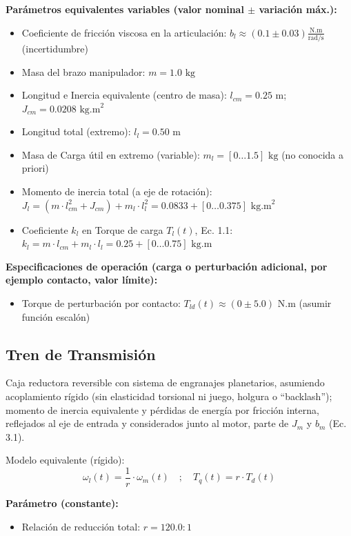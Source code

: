 \documentclass[11pt,a4paper]{article}
\begin{document}
\textbf{Parámetros equivalentes variables (valor nominal \(\pm\) variación máx.):}
\begin{itemize}
    \item Coeficiente de fricción viscosa en la articulación: $b_{l} \approx (0.1 \pm 0.03) \frac{\text{N.m}}{\text{rad/s}}$ (incertidumbre)
    \item Masa del brazo manipulador: $m = 1.0 \text{ kg}$
    \item Longitud e Inercia equivalente (centro de masa): $l_{cm} = 0.25 \text{ m}$; $J_{cm} = 0.0208 \text{ kg.m}^2$
    \item Longitud total (extremo): $l_{l} = 0.50 \text{ m}$
    \item Masa de Carga útil en extremo (variable): $m_{l} = [0 \dots 1.5] \text{ kg}$ (no conocida a priori)
    \item Momento de inercia total (a eje de rotación): $J_l = (m \cdot l_{cm}^2 + J_{cm}) + m_{l} \cdot l_{l}^2 = 0.0833 + [0 \dots 0.375] \text{ kg.m}^2$
    \item Coeficiente $k_{l}$ en Torque de carga $T_{l}(t)$, Ec. 1.1: $k_{l} = m \cdot l_{cm} + m_{l} \cdot l_{l} = 0.25 + [0 \dots 0.75] \text{ kg.m}$
\end{itemize}

\textbf{Especificaciones de operación (carga o perturbación adicional, por ejemplo contacto, valor límite):}
\begin{itemize}
    \item Torque de perturbación por contacto: $T_{ld}(t) \approx (0 \pm 5.0) \text{ N.m}$ (asumir función escalón)
\end{itemize}

\subsection*{Tren de Transmisión}
Caja reductora reversible con sistema de engranajes planetarios, asumiendo acoplamiento rígido (sin elasticidad torsional ni juego, holgura o ``backlash''); momento de inercia equivalente y pérdidas de energía por fricción interna, reflejados al eje de entrada y considerados junto al motor, parte de $J_{m}$ y $b_{m}$ (Ec. 3.1).

Modelo equivalente (rígido):
\begin{equation}
\omega_{l}(t) = \frac{1}{r} \cdot \omega_{m}(t) \quad ; \quad T_{q}(t) = r \cdot T_{d}(t) \tag{Ec. 2.1/2.2}
\end{equation}

\textbf{Parámetro (constante):}
\begin{itemize}
    \item Relación de reducción total: $r = 120.0 : 1$
\end{itemize}
\end{document}
